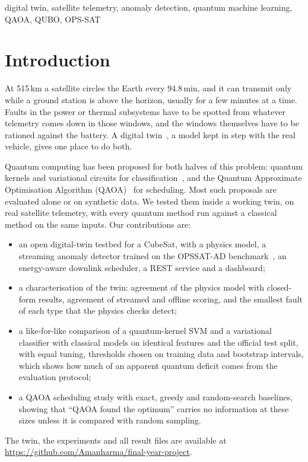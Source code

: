 \documentclass[conference]{IEEEtran}
\begin{document}
\begin{IEEEkeywords}
digital twin, satellite telemetry, anomaly detection, quantum machine learning, QAOA, QUBO, OPS-SAT
\end{IEEEkeywords}

\section{Introduction}
At 515\,km a satellite circles the Earth every 94.8\,min, and it can transmit only while a
ground station is above the horizon, usually for a few minutes at a time. Faults in the power
or thermal subsystems have to be spotted from whatever telemetry comes down in those windows,
and the windows themselves have to be rationed against the battery. A digital
twin~\cite{grieves2017,glaessgen2012}, a model kept in step with the real vehicle, gives one
place to do both.

Quantum computing has been proposed for both halves of this problem: quantum kernels and
variational circuits for classification~\cite{havlicek2019,schuld2019}, and the Quantum
Approximate Optimisation Algorithm (QAOA)~\cite{farhi2014} for scheduling. Most such proposals
are evaluated alone or on synthetic data. We tested them inside a working twin, on real
satellite telemetry, with every quantum method run against a classical method on the same
inputs. Our contributions are:
\begin{itemize}
\item an open digital-twin testbed for a CubeSat, with a physics model, a streaming anomaly
detector trained on the OPSSAT-AD benchmark~\cite{ruszczak2025}, an energy-aware downlink
scheduler, a REST service and a dashboard;
\item a characterisation of the twin: agreement of the physics model with closed-form
results, agreement of streamed and offline scoring, and the smallest fault of each type that
the physics checks detect;
\item a like-for-like comparison of a quantum-kernel SVM and a variational classifier with
classical models on identical features and the official test split, with equal tuning,
thresholds chosen on training data and bootstrap intervals, which shows how much of an
apparent quantum deficit comes from the evaluation protocol;
\item a QAOA scheduling study with exact, greedy and random-search baselines, showing that
``QAOA found the optimum'' carries no information at these sizes unless it is compared with
random sampling.
\end{itemize}
The twin, the experiments and all result files are available at
\url{https://github.com/Amanharma/final-year-project}.
\end{document}
